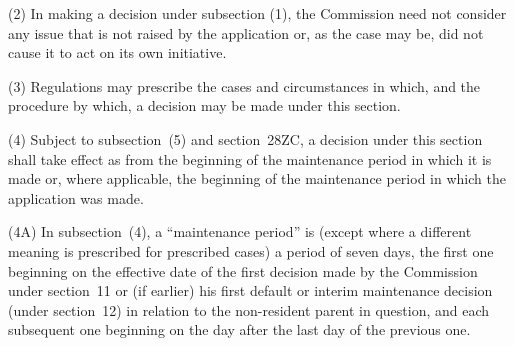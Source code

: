 \documentclass[12pt,a4paper]{article}
\begin{document}
(2) In making a decision under subsection (1), the 
Commission  %
need not consider any issue that is not raised by the application or, as the case may be, did not cause 
it  %
to act on 
its  %
own initiative.

(3) Regulations may prescribe the cases and circumstances in which, and the procedure by which, a decision may be made under this section.

%
%
%


(4) Subject to subsection~(5)  and section~28ZC, a decision under this section shall take effect as from the beginning of the maintenance period in which it is made or, where applicable, the beginning of the maintenance period in which the application was made.

(4A) In subsection~(4), a “maintenance period” is (except where a different meaning is prescribed for prescribed cases) a period of seven days, the first one beginning on the effective date of the first decision made by the 
Commission  %
under section~11 or (if earlier) his first default or interim maintenance decision (under section~12) in relation to the non-resident parent in question, and each subsequent one beginning on the day after the last day of the previous one.
\end{document}
